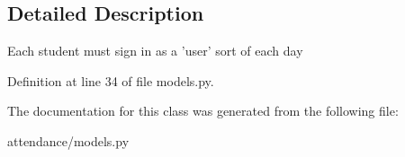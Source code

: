 \subsection{Detailed Description}
\begin{DoxyVerb}Each student must sign in as a 'user' sort of each day
\end{DoxyVerb}
 

Definition at line 34 of file models.\+py.



The documentation for this class was generated from the following file\+:\begin{DoxyCompactItemize}
\item 
attendance/models.\+py\end{DoxyCompactItemize}
